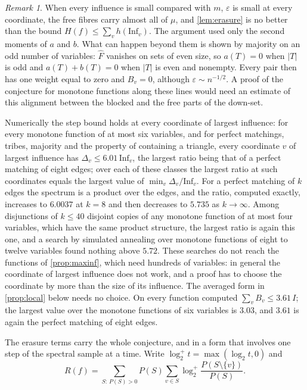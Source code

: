 \documentclass[11pt]{amsart}
\theoremstyle{remark}
\newtheorem{remark}[theorem]{Remark}
\newcommand{\Inf}{\mathrm{Inf}}
\newcommand{\eps}{\varepsilon}
\begin{document}
\begin{remark}
When every influence is small compared with $m$, $\eps$ is small at every coordinate, the free fibres carry almost
all of $\mu$, and \cref{lem:erasure} is no better than the bound $H(f)\le\sum_vh(\Inf_v)$. The argument used only the second moments of
$a$ and $b$. What can happen beyond them is shown by majority on an odd number of variables: $\widehat F$ vanishes on
sets of even size, so $a(T)=0$ when $|T|$ is odd and $a(T)+b(T)=0$ when $|T|$ is even and nonempty. Every pair then
has one weight equal to zero and $B_v=0$, although $\eps\sim n^{-1/2}$. A proof of the conjecture for monotone
functions along these lines would need an estimate of this alignment between the blocked and the free parts of the
down-set.

Numerically the step bound holds at every coordinate of largest influence: for every monotone function of at most six
variables, and for perfect matchings, tribes, majority and the property of containing a triangle, every coordinate $v$
of largest influence has $\Delta_v\le6.01\,\Inf_v$, the largest ratio being that of a perfect matching of eight
edges; over each of these classes the largest ratio at such coordinates equals the largest value of
$\min_v\Delta_v/\Inf_v$. For a perfect matching of $k$ edges the spectrum is a product over the edges, and the ratio,
computed exactly, increases to $6.0037$ at $k=8$ and then decreases to $5.735$ as $k\to\infty$. Among disjunctions of
$k\le40$ disjoint copies of any monotone function of at most four variables, which have the same product structure, the
largest ratio is again this one, and a search by simulated annealing over monotone functions of eight to twelve
variables found nothing above $5.72$. These searches do not reach the functions of \cref{prop:maxinf}, which need
hundreds of variables: in general the coordinate of largest influence does not work, and a proof has to choose the
coordinate by more than the size of its influence. The averaged form in \cref{prop:local} below needs no choice. On
every function computed $\sum_vB_v\le3.61\,I$; the largest value over the monotone functions of six variables is
$3.03$, and $3.61$ is again the perfect matching of eight edges.
\end{remark}

The erasure terms carry the whole conjecture, and in a form that involves one step of the spectral sample at a time.
Write $\log_2^+t=\max(\log_2t,0)$ and
\[
R(f)=\sum_{S:\,P(S)>0}P(S)\sum_{v\in S}\log_2^+\frac{P(S\setminus\{v\})}{P(S)} .
\]
\end{document}
